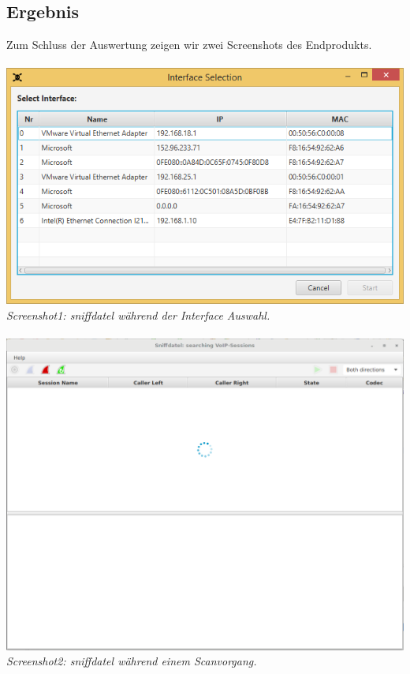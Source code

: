 \documentclass[a4,12pt]{scrartcl}
\begin{document}
\subsection{Ergebnis}
Zum Schluss der Auswertung zeigen wir zwei Screenshots des Endprodukts. \\
\\
\includegraphics[width=1\textwidth]{./pictures/interface.png}\\
\textit{Screenshot1: sniffdatel während der Interface Auswahl.}\\
\\
\includegraphics[width=1\textwidth]{./pictures/gui1.png}\\
\textit{Screenshot2: sniffdatel während einem Scanvorgang.}\\
\\
\end{document}
